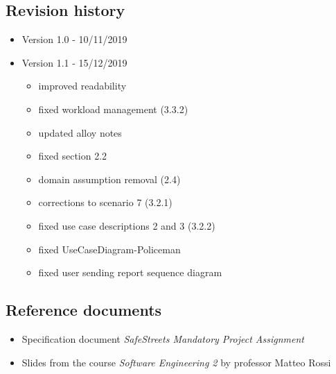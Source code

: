 \subsection{Revision history}
\begin{itemize}
	\item Version 1.0 - 10/11/2019
	\item Version 1.1 - 15/12/2019
	\begin{itemize}
		\item improved readability
		\item fixed workload management (3.3.2)
		\item updated alloy notes
		\item fixed section 2.2
		\item domain assumption removal (2.4)
		\item corrections to scenario 7 (3.2.1)
		\item fixed use case descriptions 2 and 3 (3.2.2)
		\item fixed UseCaseDiagram-Policeman
		\item fixed user sending report sequence diagram
	\end{itemize}
\end{itemize}
\subsection{Reference documents}
\begin{itemize}
	\item Specification document \textit{SafeStreets Mandatory Project Assignment} 
	\item Slides from the course \textit{Software Engineering 2} by professor Matteo Rossi
\end{itemize}
